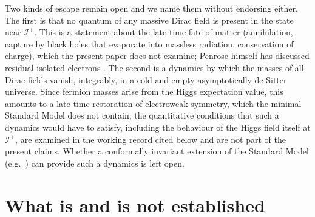 \documentclass[11pt,a4paper]{article}
\theoremstyle{definition}
\newcommand{\scri}{\mathscr{I}^{+}}
\begin{document}
Two kinds of escape remain open and we name them without endorsing either. The first is that no quantum of any massive Dirac field is present in the state near $\scri$. This is a statement about the late-time fate of matter (annihilation, capture by black holes that evaporate into massless radiation, conservation of charge), which the present paper does not examine; Penrose himself has discussed residual isolated electrons \cite{Penrose2010}. The second is a dynamics by which the masses of all Dirac fields vanish, integrably, in a cold and empty asymptotically de Sitter universe. Since fermion masses arise from the Higgs expectation value, this amounts to a late-time restoration of electroweak symmetry, which the minimal Standard Model does not contain; the quantitative conditions that such a dynamics would have to satisfy, including the behaviour of the Higgs field itself at $\scri$, are examined in the working record cited below and are not part of the present claims. Whether a conformally invariant extension of the Standard Model (e.g.\ \cite{MeissnerNicolai2007}) can provide such a dynamics is left open.

\section{What is and is not established}
\label{sec:scope}
\end{document}
